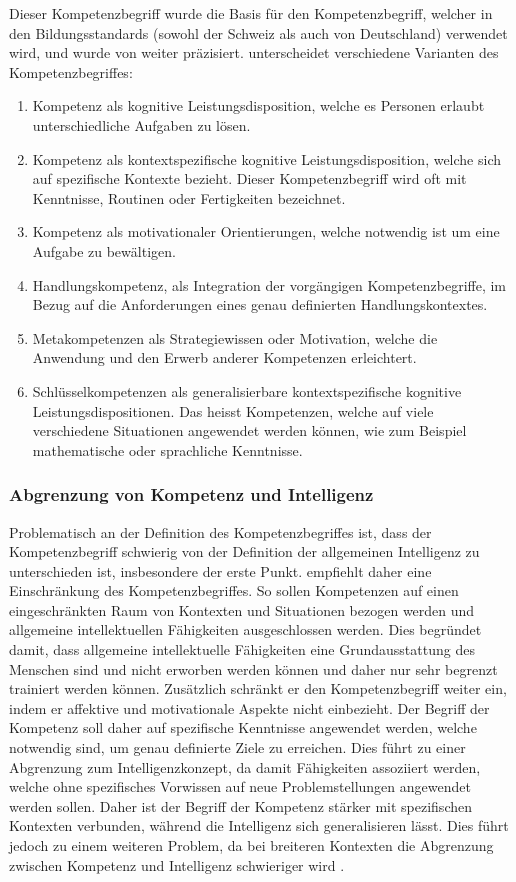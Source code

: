 Dieser Kompetenzbegriff wurde die Basis für den Kompetenzbegriff, welcher in den Bildungsstandards (sowohl der Schweiz als auch von Deutschland) verwendet wird, und wurde von \citet{Klieme2004} weiter präzisiert.
\citet{Klieme2004} unterscheidet verschiedene Varianten des Kompetenzbegriffes: 
\begin{enumerate}
\item Kompetenz als kognitive Leistungsdisposition, welche es Personen erlaubt unterschiedliche Aufgaben zu lösen.
\item Kompetenz als kontextspezifische kognitive Leistungsdisposition, welche sich auf spezifische Kontexte bezieht. Dieser Kompetenzbegriff wird oft mit Kenntnisse, Routinen oder Fertigkeiten bezeichnet.
\item Kompetenz als motivationaler Orientierungen, welche notwendig ist um eine Aufgabe zu bewältigen.
\item Handlungskompetenz, als Integration der vorgängigen Kompetenzbegriffe, im Bezug auf die Anforderungen eines genau definierten Handlungskontextes.
\item Metakompetenzen als Strategiewissen oder Motivation, welche die Anwendung und den Erwerb anderer Kompetenzen erleichtert.
\item Schlüsselkompetenzen als generalisierbare kontextspezifische kognitive Leistungsdispositionen. Das heisst Kompetenzen, welche auf viele verschiedene Situationen angewendet werden können, wie zum Beispiel mathematische oder sprachliche Kenntnisse.
\end{enumerate}




\subsubsection*{Abgrenzung von Kompetenz und Intelligenz}
Problematisch an der Definition des Kompetenzbegriffes ist, dass der Kompetenzbegriff schwierig von der Definition der allgemeinen Intelligenz zu unterschieden ist, insbesondere der erste Punkt. \citet{Weinert2001b} empfiehlt daher eine Einschränkung des Kompetenzbegriffes. So sollen Kompetenzen auf einen eingeschränkten Raum von Kontexten und Situationen bezogen werden und allgemeine intellektuellen Fähigkeiten ausgeschlossen werden. Dies begründet \citet{Weinert2001b} damit, dass allgemeine intellektuelle Fähigkeiten eine Grundausstattung des Menschen sind und nicht erworben werden können und daher nur sehr begrenzt trainiert werden können. Zusätzlich schränkt er den Kompetenzbegriff weiter ein, indem er affektive und motivationale Aspekte nicht einbezieht. Der Begriff der Kompetenz soll daher auf spezifische Kenntnisse angewendet werden, welche notwendig sind, um genau definierte Ziele zu erreichen. Dies führt zu einer Abgrenzung zum Intelligenzkonzept, da damit Fähigkeiten assoziiert werden, welche ohne spezifisches Vorwissen auf neue Problemstellungen angewendet werden sollen. Daher ist der Begriff der Kompetenz stärker mit spezifischen Kontexten verbunden, während die Intelligenz sich generalisieren lässt. Dies führt jedoch zu einem weiteren Problem, da bei breiteren Kontexten die Abgrenzung zwischen Kompetenz und Intelligenz schwieriger wird \citep{Hartig2006}.


